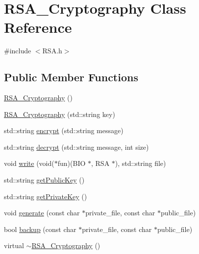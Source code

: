 \hypertarget{classRSA__Cryptography}{}\section{R\+S\+A\+\_\+\+Cryptography Class Reference}
\label{classRSA__Cryptography}


{\ttfamily \#include $<$R\+S\+A.\+h$>$}

\subsection*{Public Member Functions}
\begin{DoxyCompactItemize}
\item 
\mbox{\hyperlink{classRSA__Cryptography_aeca5b9b416a49fea20e7fc69ca18d641}{R\+S\+A\+\_\+\+Cryptography}} ()
\item 
\mbox{\hyperlink{classRSA__Cryptography_ae2cd6fb565102dc8007de9d305026e45}{R\+S\+A\+\_\+\+Cryptography}} (std\+::string key)
\item 
std\+::string \mbox{\hyperlink{classRSA__Cryptography_a8ea8d421dcb5012ffc8fd23660bae1bc}{encrypt}} (std\+::string message)
\item 
std\+::string \mbox{\hyperlink{classRSA__Cryptography_a03760e4f7eae8e7b961f8b948c0dafb1}{decrypt}} (std\+::string message, int size)
\item 
void \mbox{\hyperlink{classRSA__Cryptography_a7772b886bb2f27b95df33019d04eee69}{write}} (void($\ast$fun)(B\+IO $\ast$, R\+SA $\ast$), std\+::string file)
\item 
std\+::string \mbox{\hyperlink{classRSA__Cryptography_a9692bde79db1e43da95511fe0d0c1a0b}{get\+Public\+Key}} ()
\item 
std\+::string \mbox{\hyperlink{classRSA__Cryptography_aecdd6715cb222a98b5810f49103c34d7}{get\+Private\+Key}} ()
\item 
void \mbox{\hyperlink{classRSA__Cryptography_aaf500fcdcc050fa8d18a0dbe43176d17}{generate}} (const char $\ast$private\+\_\+file, const char $\ast$public\+\_\+file)
\item 
bool \mbox{\hyperlink{classRSA__Cryptography_ae3ccf77d8754acdfb444dbab6fb6a4dd}{backup}} (const char $\ast$private\+\_\+file, const char $\ast$public\+\_\+file)
\item 
virtual \mbox{\hyperlink{classRSA__Cryptography_ae8a837cfb0a55afd707af939261acc52}{$\sim$\+R\+S\+A\+\_\+\+Cryptography}} ()
\end{DoxyCompactItemize}


